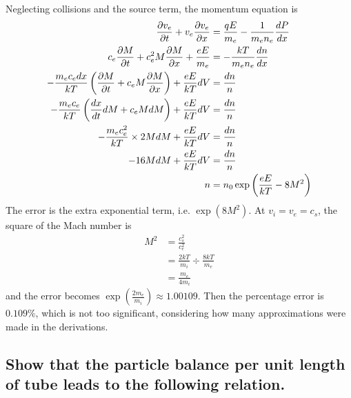 \documentclass[answers]{exam}
\begin{document}
\begin{questions}
\begin{parts}
\begin{solution}
    Neglecting collisions and the source term, the momentum equation is
    \begin{align*}
        \frac{\partial v_e}{\partial t} + v_e \frac{\partial v_e}{\partial x} &= \frac{qE}{m_e} - \frac{1}{m_en_e} \frac{dP}{dx} \\
        c_e \frac{\partial M}{\partial t} + c_e^2 M \frac{\partial M}{\partial x} + \frac{eE}{m_e} &= -\frac{kT}{m_en_e} \frac{dn}{dx} \\
        -\frac{m_ec_edx}{kT} \left(\frac{\partial M}{\partial t} + c_e M\frac{\partial M}{\partial x}\right) + \frac{eE}{kT} dV &= \frac{dn}{n} \\
        -\frac{m_ec_e}{kT} \left(\frac{dx}{dt}dM + c_eMdM\right) + \frac{eE}{kT} dV &= \frac{dn}{n} \\
        -\frac{m_ec_e^2}{kT} \times 2MdM + \frac{eE}{kT} dV &= \frac{dn}{n} \\
        -16MdM + \frac{eE}{kT} dV &= \frac{dn}{n} \\
        n &= n_0\exp\left(\frac{eE}{kT} - 8M^2\right)
    \end{align*}
    The error is the extra exponential term, i.e. $\exp(8M^2)$. At $v_i = v_e = c_s$, the square of the Mach number is
    \begin{align*}
        M^2 &= \frac{c_s^2}{c_e^2} \\
            &= \frac{2kT}{m_i} \div \frac{8kT}{m_e} \\
            &= \frac{m_e}{4m_i}
    \end{align*}
    and the error becomes $\exp\left(\frac{2m_e}{m_i}\right) \approx 1.00109$. Then the percentage error is $0.109\%$, which is not too significant, considering how many approximations were made in the derivations.
\end{solution}

\end{parts}



\begin{parts}

\part{Show that the particle balance per unit length of tube leads to the following relation.}


\end{parts}
\end{questions}
\end{document}
